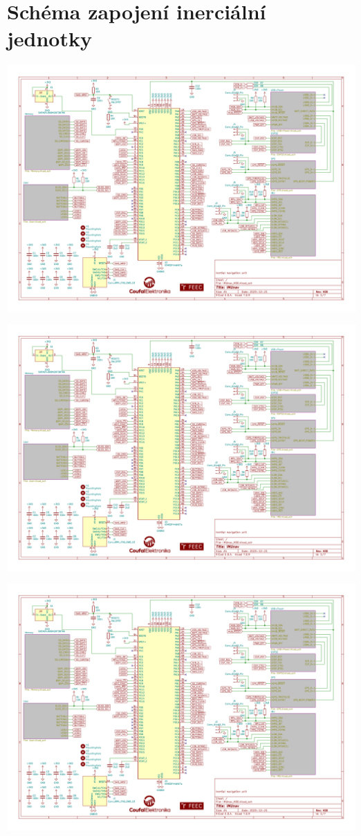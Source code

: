 

\chapter{Schéma zapojení inerciální jednotky} \label{schemaApp}
\includegraphics[angle=90, page=1, width=\textwidth]{KiCad/schematic.pdf}

\includegraphics[angle=90, page=2, width=\textwidth]{KiCad/schematic.pdf}

\includegraphics[angle=90, page=3, width=\textwidth]{KiCad/schematic.pdf}

